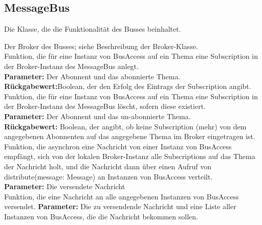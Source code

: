 \documentclass[entwurf.tex]{subfiles}
\begin{document}
	\subsection{MessageBus}
	\label{Class:MessageBus}
		Die Klasse, die die Funktionalität des Busses beinhaltet.
		\begin{description}
				Der Broker des Busses; siehe Beschreibung der Broker-Klasse. \\
				
			Funktion, die für eine Instanz von BusAccess auf ein Thema eine Subscription in der Broker-Instanz des MessageBus anlegt. \\
			\textbf{Parameter:} Der Abonnent und das abonnierte Thema. \\
			\textbf{Rückgabewert:}Boolean, der den Erfolg des Eintrags der Subscription angibt. \\
			
			Funktion, die für eine Instanz von BusAccess auf ein Thema eine Subscription in der Broker-Instanz des MessageBus löscht, sofern diese existiert. \\
			\textbf{Parameter:} Der Abonnent und das un-abonnierte Thema. \\
			\textbf{Rückgabewert:} Boolean, der angibt, ob keine Subscription (mehr) von dem angegebenen Abonnenten auf das angegebene Thema im Broker eingetragen ist. \\
			
			Funktion, die asynchron eine Nachricht von einer Instanz von BusAccess empfängt, sich von der lokalen Broker-Instanz alle Subscriptions auf das Thema der Nachricht holt, und die Nachricht dann über einen Aufruf von distribute(message: Message) an Instanzen von BusAccess verteilt. \\
			\textbf{Parameter:} Die versendete Nachricht \\
			
			Funktion, die eine Nachricht an alle angegebenen Instanzen von BusAccess versendet.
			\textbf{Parameter:} Die zu versendende Nachricht und eine Liste aller Instanzen von BusAccess, die die Nachricht bekommen sollen. \\
			\end{description}
			
\end{document}
